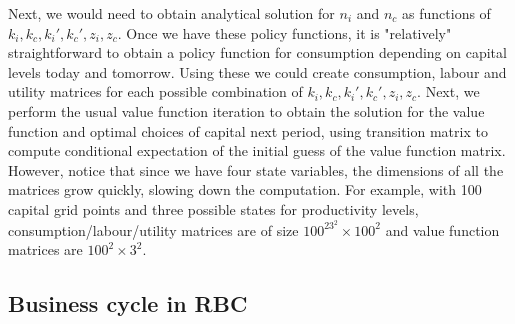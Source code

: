 \documentclass[]{article}
\begin{document}
Next, we would need to obtain analytical solution for $n_i$ and $n_c$ as functions of $k_i, k_c, k_i', k_c', z_i, z_c$. Once we have these policy functions, it is "relatively" straightforward to obtain a policy function for consumption depending on capital levels today and tomorrow. Using these we could create consumption, labour and utility matrices for each possible combination of $k_i, k_c, k_i', k_c', z_i, z_c$. Next, we perform the usual value function iteration to obtain the solution for the value function and optimal choices of capital next period, using transition matrix to compute conditional expectation of the initial guess of the value function matrix. However, notice that since we have four state variables, the dimensions of all the matrices grow quickly, slowing down the computation. For example, with 100 capital grid points and three possible states for productivity levels, consumption/labour/utility matrices are of size $100^23^2\times100^2$ and value function matrices are $100^2\times3^2$.

\subsection{Business cycle in RBC}
\end{document}

